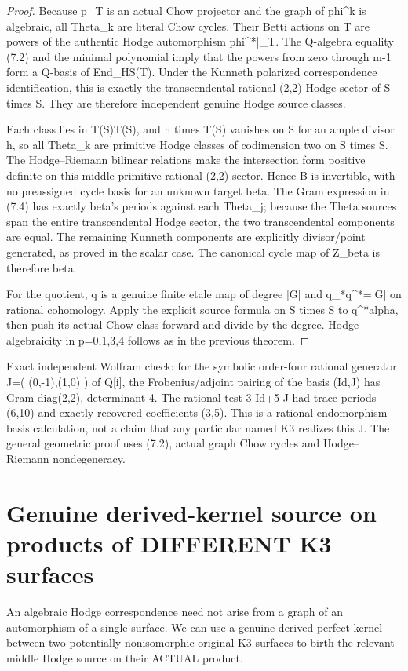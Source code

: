 \documentclass[11pt]{article}
\begin{document}
\begin{proof}
Because p_T is an actual Chow projector
and the graph of phi^k is algebraic,
all Theta_k are literal Chow cycles.
Their Betti actions on T are powers
of the authentic Hodge automorphism
phi^*|_T. The Q-algebra equality (7.2)
and the minimal polynomial imply that
the powers from zero through m-1 form
a Q-basis of End_HS(T). Under the
Kunneth polarized correspondence
identification, this is exactly the
transcendental rational (2,2) Hodge sector
of S times S. They are therefore
independent genuine Hodge source classes.

Each class lies in T(S)\otimes T(S),
and h times T(S) vanishes on S
for an ample divisor h, so all Theta_k
are primitive Hodge classes of
codimension two on S times S.
The Hodge--Riemann bilinear relations
make the intersection form positive
definite on this middle primitive
rational (2,2) sector. Hence B is
invertible, with no preassigned cycle
basis for an unknown target beta.
The Gram expression in (7.4)
has exactly beta's periods against
each Theta_j; because the Theta
sources span the entire transcendental
Hodge sector, the two transcendental
components are equal. The remaining
Kunneth components are explicitly
divisor/point generated, as proved
in the scalar case. The canonical
cycle map of Z_beta is therefore beta.

For the quotient, q is a genuine finite
etale map of degree |G| and
q_*q^*=|G| on rational cohomology.
Apply the explicit source formula
on S times S to q^*alpha, then
push its actual Chow class forward
and divide by the degree.
Hodge algebraicity in p=0,1,3,4
follows as in the previous theorem.
\end{proof}

\noindent Exact independent Wolfram check:
for the symbolic order-four rational generator
J=( (0,-1),(1,0) ) of Q[i],
the Frobenius/adjoint pairing of
the basis (Id,J) has Gram diag(2,2),
determinant 4. The rational test
3 Id+5 J had trace periods (6,10)
and exactly recovered coefficients (3,5).
This is a rational endomorphism-basis
calculation, not a claim that any
particular named K3 realizes this J.
The general geometric proof uses (7.2),
actual graph Chow cycles and
Hodge--Riemann nondegeneracy.

\section{Genuine derived-kernel source on products of DIFFERENT K3 surfaces}
An algebraic Hodge correspondence need not arise
from a graph of an automorphism of a single surface.
We can use a genuine derived perfect kernel
between two potentially nonisomorphic original
K3 surfaces to birth the relevant middle
Hodge source on their ACTUAL product.
\end{document}
